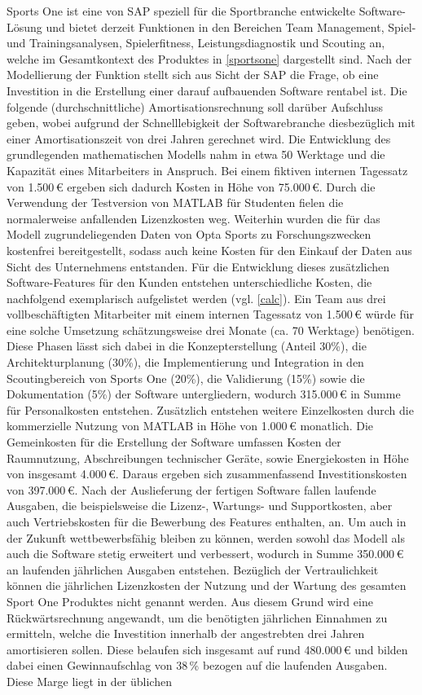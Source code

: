 Sports One ist eine von SAP speziell für die Sportbranche entwickelte Software-Lösung und bietet derzeit Funktionen in den Bereichen Team Management, Spiel- und Trainingsanalysen, Spielerfitness, Leistungsdiagnostik und Scouting an, welche im Gesamtkontext des Produktes in \vref{sportsone} dargestellt sind. Nach der Modellierung der Funktion stellt sich aus Sicht der SAP die Frage, ob eine Investition in die Erstellung einer darauf aufbauenden Software rentabel ist. Die folgende (durchschnittliche) Amortisationsrechnung soll darüber Aufschluss geben, wobei aufgrund der Schnelllebigkeit der Softwarebranche diesbezüglich mit einer Amortisationszeit von drei Jahren gerechnet wird. Die Entwicklung des grundlegenden mathematischen Modells nahm in etwa 50 Werktage und die Kapazität eines Mitarbeiters in Anspruch. Bei einem fiktiven internen Tagessatz von \textsf{1.500\,\euro} ergeben sich dadurch Kosten in Höhe von \textsf{75.000\,\euro}. Durch die Verwendung der Testversion von MATLAB für Studenten fielen die normalerweise anfallenden Lizenzkosten weg. Weiterhin wurden die für das Modell zugrundeliegenden Daten von Opta Sports zu Forschungszwecken kostenfrei bereitgestellt, sodass auch keine Kosten für den Einkauf der Daten aus Sicht des Unternehmens entstanden. Für die Entwicklung dieses zusätzlichen Software-Features für den Kunden entstehen unterschiedliche Kosten, die nachfolgend exemplarisch aufgelistet werden (vgl. \vref{calc}). Ein Team aus drei vollbeschäftigten Mitarbeiter mit einem internen Tagessatz von \textsf{1.500\,\euro} würde für eine solche Umsetzung schätzungsweise drei Monate (ca. 70 Werktage) benötigen. Diese Phasen lässt sich dabei in die Konzepterstellung (Anteil 30\%), die Architekturplanung (30\%), die Implementierung und Integration in den Scoutingbereich von Sports One (20\%), die Validierung (15\%) sowie die Dokumentation (5\%) der Software untergliedern, wodurch \textsf{315.000\,\euro} in Summe für Personalkosten entstehen. Zusätzlich entstehen weitere Einzelkosten durch die kommerzielle Nutzung von MATLAB in Höhe von \textsf{1.000\,\euro} monatlich. Die Gemeinkosten für die Erstellung der Software umfassen Kosten der Raumnutzung, Abschreibungen technischer Geräte, sowie Energiekosten in Höhe von insgesamt \textsf{4.000\,\euro}. Daraus ergeben sich zusammenfassend Investitionskosten von \textsf{397.000\,\euro}. Nach der Auslieferung der fertigen Software fallen laufende Ausgaben, die beispielsweise die Lizenz-, Wartungs- und Supportkosten, aber auch Vertriebskosten für die Bewerbung des Features enthalten, an. Um auch in der Zukunft wettbewerbsfähig bleiben zu können, werden sowohl das Modell als auch die Software stetig erweitert und verbessert, wodurch in Summe \textsf{350.000\,\euro} an laufenden jährlichen Ausgaben entstehen. Bezüglich der Vertraulichkeit können die jährlichen Lizenzkosten der Nutzung und der Wartung des gesamten Sport One Produktes nicht genannt werden. Aus diesem Grund wird eine Rückwärtsrechnung angewandt, um die benötigten jährlichen Einnahmen zu ermitteln, welche die Investition innerhalb der angestrebten drei Jahren amortisieren sollen. Diese belaufen sich insgesamt auf rund \textsf{480.000\,\euro} und bilden dabei einen Gewinnaufschlag von \textsf{38\,\%} bezogen auf die laufenden Ausgaben. Diese Marge liegt in der üblichen 